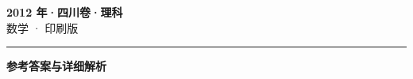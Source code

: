 \documentclass[zihao=5, a4paper]{ctexart}
\begin{document}
\begin{center}
  {\Large\bfseries 2012 年·四川卷·理科}\\[4pt]
  {\large 数学 · 印刷版}
\end{center}
\medskip
{}

\par\bigskip\hrule\bigskip
{}
\Needspace{0.55\textheight}
\begin{center}{\large\bfseries 参考答案与详细解析}\end{center}
\smallskip

\end{document}
